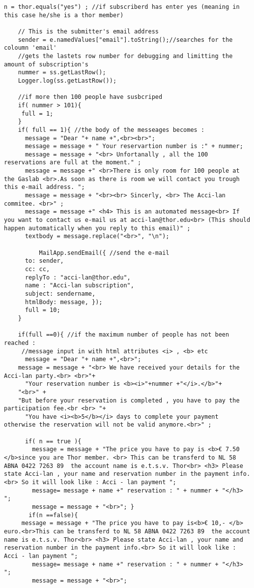 \documentclass{article}
\begin{document}
\begin{lstlisting}[caption = Google Form emailer ]
    n = thor.equals("yes") ; //if subscriberd has enter yes (meaning in this case he/she is a thor member)
   
    // This is the submitter's email address
    sender = e.namedValues["email"].toString();//searches for the coloumn 'email'
    //gets the lastets row number for debugging and limitting the amount of subscription's
    nummer = ss.getLastRow();
    Logger.log(ss.getLastRow());
    
    //if more then 100 people have susbcriped
    if( nummer > 101){
     full = 1; 
    }
    if( full == 1){ //the body of the messeages becomes :
      message = "Dear "+ name +",<br><br>";
      message = message + " Your reservartion number is :" + nummer;
      message = message + "<br> Unfortanally , all the 100 reservations are full at the moment." ;
      message = message +" <br>There is only room for 100 people at the Gaslab <br>.As soon as there is room we will contact you trough this e-mail address. ";
      message = message + "<br><br> Sincerly, <br> The Acci-lan commitee. <br>" ;
      message = message +" <h4> This is an automated message<br> If you want to contact us e-mail us at acci-lan@thor.edu<br> (This should happen automatically when you reply to this email)" ;
      textbody = message.replace("<br>", "\n");
      
          MailApp.sendEmail({ //send the e-mail 
      to: sender,
      cc: cc,
      replyTo : "acci-lan@thor.edu",
      name : "Acci-lan subscription",
      subject: sendername,
      htmlBody: message, });
      full = 10;
    }
    
    if(full ==0){ //if the maximum number of people has not been reached :
     //message input in with html attributes <i> , <b> etc 
      message = "Dear "+ name +",<br>";
    message = message + "<br> We have received your details for the Acci-lan party.<br> <br>"+
      "Your reservation number is <b><i>"+nummer +"</i>.</b>"+
    "<br>" +
    "But before your reservation is completed , you have to pay the participation fee.<br <br> "+ 
      "You have <i><b>5</b></i> days to complete your payment otherwise the reservation will not be valid anymore.<br>" ;
    
      if( n == true ){
        message = message + "The price you have to pay is <b>€ 7.50 </b>since you are Thor member. <br> This can be transferd to NL 58 ABNA 0422 7263 89  the account name is e.t.s.v. Thor<br> <h3> Please state Acci-lan , your name and reservation number in the payment info.<br> So it will look like : Acci - lan payment "; 
        message= message + name +" reservation : " + nummer + "</h3> ";
        message = message + "<br>"; }
       if(n ==false){
     message = message + "The price you have to pay is<b>€ 10,- </b> euro.<br>This can be transferd to NL 58 ABNA 0422 7263 89  the account name is e.t.s.v. Thor<br> <h3> Please state Acci-lan , your name and reservation number in the payment info.<br> So it will look like : Acci - lan payment "; 
        message= message + name +" reservation : " + nummer + "</h3> ";
        message = message + "<br>";
     

\end{lstlisting}
\end{document}
